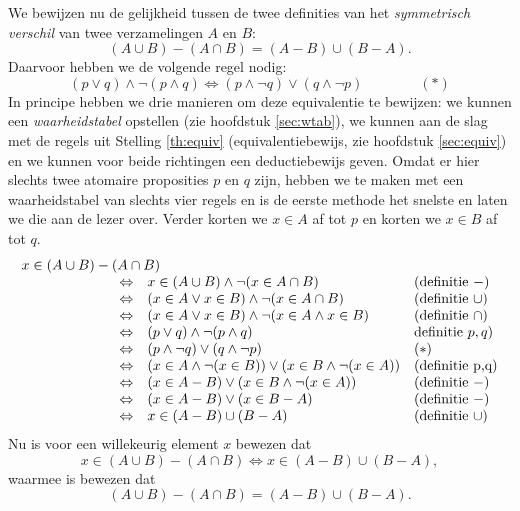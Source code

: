We bewijzen nu de gelijkheid tussen de twee definities van het \textit{symmetrisch verschil} van twee verzamelingen $A$ en $B$:
$$(A\cup B)-(A\cap B)=(A-B)\cup(B-A).$$
Daarvoor hebben we de volgende regel nodig:
$$(p\lor q)\land\neg(p\land q)\Leftrightarrow(p\land\neg q)\lor(q\land\neg p)\qquad\qquad(*)$$
In principe hebben we drie manieren om deze equivalentie te bewijzen: we kunnen een \textit{waarheidstabel} opstellen (zie hoofdstuk \ref{sec:wtab}), we kunnen aan de slag met de regels uit Stelling \ref{th:equiv} (equivalentiebewijs, zie hoofdstuk \ref{sec:equiv}) en we kunnen voor beide richtingen een deductiebewijs geven. Omdat er hier slechts twee atomaire proposities $p$ en $q$ zijn, hebben we te maken met een waarheidstabel van slechts vier regels en is de eerste methode het snelste en laten we die aan de lezer over. Verder korten we $x\in A$ af tot $p$ en korten we $x\in B$ af tot $q$.
$$\begin{array}{lcll}
\multicolumn{3}{l}{x\in(A\cup B)-(A\cap B)}\\
\qquad\qquad\qquad &\Leftrightarrow&x\in(A\cup B)\wedge\neg(x\in A\cap B)&\text{(definitie $-$)}\\
&\Leftrightarrow&(x\in A\vee x\in B)\wedge\neg(x\in A\cap B)&\text{(definitie $\cup$)}\\
&\Leftrightarrow&(x\in A\vee x\in B)\wedge\neg(x\in A\wedge x\in B)&\text{(definitie $\cap$)}\\
&\Leftrightarrow&(p\lor q)\wedge\neg(p\wedge q)&\text{definitie $p,q$)}\\
&\Leftrightarrow&(p\land\neg q)\lor(q\land\neg p)&(*)\\
&\Leftrightarrow&(x\in A\land\neg(x\in B))\lor(x\in B\land\neg(x\in A))&\text{(definitie p,q)}\\
&\Leftrightarrow&(x\in A-B)\lor(x\in B\land\neg(x\in A))&\text{(definitie $-$)}\\
&\Leftrightarrow&(x\in A-B)\lor(x\in B-A)&\text{(definitie $-$)}\\
&\Leftrightarrow&x\in(A-B)\cup(B-A)&\text{(definitie $\cup$)}
\end{array}$$
Nu is voor een willekeurig element $x$ bewezen dat
$$x\in(A\cup B)-(A\cap B)\Leftrightarrow x\in(A-B)\cup(B-A),$$
waarmee is bewezen dat
$$(A\cup B)-(A\cap B)=(A-B)\cup(B-A).$$

